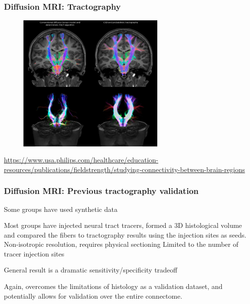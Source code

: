 \documentclass[presentation, 10pt]{beamer}
\begin{document}
\begin{frame}
  \frametitle{Diffusion MRI: Tractography}

  \begin{figure}[h]
    \centering
    \includegraphics[width=0.65\textwidth]{figs/tractography}
    \label{fig:tractography}
  \end{figure}
  \begin{center}
    \tiny{\href{https://www.usa.philips.com/healthcare/education-resources/publications/fieldstrength/studying-connectivity-between-brain-regions}{https://www.usa.philips.com/healthcare/education-resources/publications/fieldstrength/studying-connectivity-between-brain-regions}}    
  \end{center}
\end{frame}

\begin{frame}
  \frametitle{Diffusion MRI: Previous tractography validation}
  \begin{outline}
    \1 Some groups have used synthetic data\cite{Maier-Hein2017}

    \1 Most groups have injected neural tract tracers, formed a
    3D histological volume and compared the fibers to tractography results using
    the injection sites as seeds.\cite{Donahue2016, Calabrese2015, Knosche2015, Thomas2014, Seehaus2013, Dauguet2007}
    \2 Non-isotropic resolution, requires physical sectioning
    \2 Limited to the number of tracer injection sites
    
    \1 General result is a dramatic sensitivity/specificity tradeoff

    \1 Again, \uct overcomes the limitations of histology as a validation
    dataset, and potentially allows for validation over the entire connectome.
  \end{outline}
\end{frame}
\end{document}
